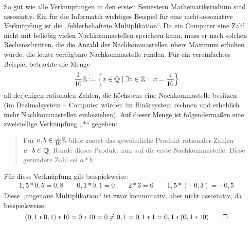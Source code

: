 \begin{comment}
\begin{bsp}[* Minimum und Maximum]
 Ist $X$ eine totalgeordnete Menge, so sind die beiden Verknüpfungen $\min$ und $\max$ aus \cref{minmax} sowohl assoziativ als auch kommutativ.
\end{bsp}
\end{comment}






\begin{comment}
\begin{bsp}[*]
 Auf jeder beliebigen Menge $X$ ist durch
 \begin{align*}
 x*y &:= y && x,y\in X  
 \end{align*}
eine Verknüpfung gegeben. Diese Verknüpfung ist assoziativ, aber, sofern $M$ mindestens zwei verschiedene Elemente enthält, nicht kommutativ.
\end{bsp}
\begin{bew}
 (Assoziativität) Seien $x,y,z\in M$ drei beliebige Elemente. Dann ist
 \[ x*(y*z) = x*z = z = (x*y)*z \]
 Also ist $*$ eine assoziative Verknüpfung. \\[0.5em]
 (Nicht-Kommutativität) Die Menge $M$ enthalte mindestens zwei verschiedene Elemente $a,b\in M$. Dann ist
 \[ a*b = b\neq a = b*a \]
 sodass die Verknüpfung nicht kommutativ ist. \qed
\end{bew}
\end{comment}




\begin{bsp} \label{fehlerrech}
So gut wie alle Verknüpfungen in den ersten Semestern Mathematikstudium sind assoziativ. Ein für die Informatik wichtiges Beispiel für eine nicht-assoziative Verknüpfung ist die „fehlerbehaftete Multiplikation“. Da ein Computer eine Zahl nicht mit beliebig vielen Nachkommastellen speichern kann, muss er nach solchen Rechenschritten, die die Anzahl der Nachkommastellen übers Maximum erhöhen würde, die letzte verfügbare Nachkommastelle runden. Für ein vereinfachtes Beispiel betrachte die Menge
 \[ \frac{1}{10}{\mathbb Z} := \left\{ x\in {\mathbb Q} \mid \exists z\in {\mathbb Z}:\ x=\frac{z}{10} \right\} \]
all derjenigen rationalen Zahlen, die höchstens eine Nachkommastelle besitzen (im Dezimalsystem -- Computer würden im Binärsystem rechnen und erheblich mehr Nachkommastellen einbeziehen). Auf dieser Menge ist folgendermaßen eine zweistellige Verknüpfung „$*$“ gegeben:
\begin{quote}
 Für $a,b\in \frac{1}{10}{\mathbb Z}$ bilde zuerst das gewöhnliche Produkt rationaler Zahlen $a\cdot b \in {\mathbb Q}$. Runde dieses Produkt nun auf die erste Nachkommastelle. Diese gerundete Zahl sei $a*b$.
\end{quote}
Für diese Verknüpfung gilt beispielsweise:
\begin{align*}
1,5* 0,5 = 0,8 \qquad 0,1* 0,1 = 0 \qquad 2*3 = 6 \qquad 1,5 * (-0,3)= -0,5 
\end{align*}
Diese „ungenaue Multiplikation“ ist zwar kommutativ, aber nicht assoziativ, da beispielsweise:
\[ (0,1 * 0,1) * 10 = 0*10 = 0 \neq 0,1 = 0,1*1 = 0,1*(0,1*10) \qedhere \]
 \end{bsp}


